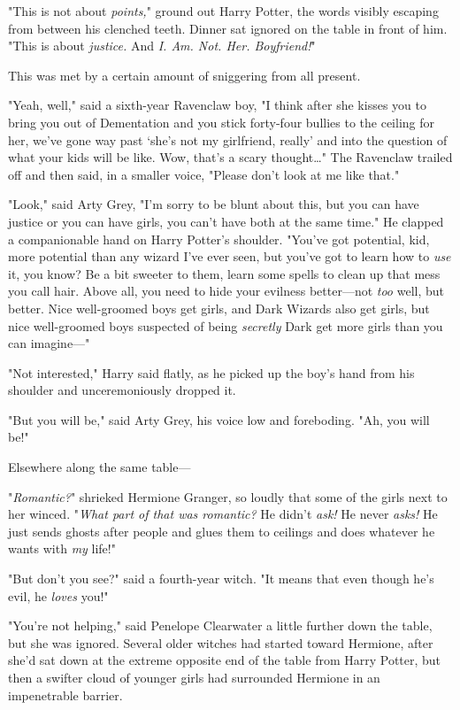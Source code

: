 "This is not about \emph{points,}" ground out Harry Potter, the words visibly
escaping from between his clenched teeth. Dinner sat ignored on the table in
front of him. "This is about \emph{justice.} And \emph{I\@. Am. Not. Her.
Boyfriend!}"

This was met by a certain amount of sniggering from all present.

"Yeah, well," said a sixth-year Ravenclaw boy, "I think after she kisses you to
bring you out of Dementation and you stick forty-four bullies to the ceiling
for her, we've gone way past `she's not my girlfriend, really' and into the
question of what your kids will be like. Wow, that's a scary thought…"
The Ravenclaw trailed off and then said, in a smaller voice, "Please don't look
at me like that."

"Look," said Arty Grey, "I'm sorry to be blunt about this, but you can have
justice or you can have girls, you can't have both at the same time." He
clapped a companionable hand on Harry Potter's shoulder. "You've got potential,
kid, more potential than any wizard I've ever seen, but you've got to learn how
to \emph{use} it, you know? Be a bit sweeter to them, learn some spells to
clean up that mess you call hair. Above all, you need to hide your evilness
better—not \emph{too} well, but better. Nice well-groomed boys get girls, and
Dark Wizards also get girls, but nice well-groomed boys suspected of being
\emph{secretly} Dark get more girls than you can imagine—"

"Not interested," Harry said flatly, as he picked up the boy's hand from his
shoulder and unceremoniously dropped it.

"But you will be," said Arty Grey, his voice low and foreboding. "Ah, you will
be!"

Elsewhere along the same table—

"\emph{Romantic?}" shrieked Hermione Granger, so loudly that some of the girls
next to her winced. "\emph{What part of that was romantic?} He didn't
\emph{ask!} He never \emph{asks!} He just sends ghosts after people and glues
them to ceilings and does whatever he wants with \emph{my} life!"

"But don't you see?" said a fourth-year witch. "It means that even though he's
evil, he \emph{loves} you!"

"You're not helping," said Penelope Clearwater a little further down the table,
but she was ignored. Several older witches had started toward Hermione, after
she'd sat down at the extreme opposite end of the table from Harry Potter, but
then a swifter cloud of younger girls had surrounded Hermione in an
impenetrable barrier.

